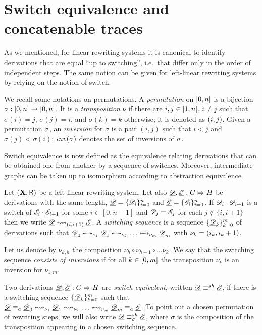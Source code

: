 \section{Switch equivalence and concatenable traces}


As we mentioned, for linear rewriting systems
it is canonical to identify
derivations that are equal ``up to switching'', i.e.~that differ
only in the order of independent steps. The same notion can be given
for left-linear rewriting systems by relying on the notion of switch.

We  recall some notations on permutations.  A \emph{permutation} on
$\interval[0]{n}$ is a bijection
$\sigma : \interval[0]{n} \to \interval[0]{n}$. It is a
\emph{transposition} $\nu$ if there are $i, j \in \interval{n}$,
$i \neq j$ such that $\sigma(i)=j$, $\sigma(j) = i$, and
$\sigma(k) = k$ otherwise; it is denoted as $\transp{i}[j]$. Given a permutation $\perm$, 
an \emph{inversion} for $\sigma$ is a pair $(i,j)$ such that $i<j$ and
$\sigma(j)< \sigma(i)$; $\inv{\sigma}$ denotes the set of
inversions of $\perm$.

Switch equivalence is now defined as the equivalence relating derivations that 
can be obtained one from another by a sequence of switches. Moreover, intermediate graphs can be taken up to isomorphism according to abstraction equivalence.

\begin{definition}
	\label{de:switch-equivalence}
	Let $(\X, \R)$ be a left-linear rewriting system.  Let also
	$\der{D}, \der{E} : G \Mapsto H$ be derivations with the same
	length, $\der{D}=\{\dder{D}_{i}\}_{i=0}^n$ and
	$\der{E}=\{\dder{E}_{i}\}_{i=0}^n$. If
	$\dder{D}_i \cdot \dder{D}_{i+1}$ is a switch of
	$\dder{E}_i \cdot \dder{E}_{i+1}$ for some $i \in [0,n-1]$ and  $\dder{D}_j = \dder{E}_j$ for each $j \not \in \{i,i+1\}$ then we write
	$\der{D} \shift{\transp{i}} \der{E}$. 
	A \emph{switching sequence} is a sequence $\{\der{D}_{k}\}_{k=0}^m$
	of derivations such that
	$\der{D}_0 \shift{\nu_1} \der{D}_1 \shift{\nu_2} \ldots
	\shift{\nu_m} \der{D}_m$  with $\nu_{k} = \transp{i_k}$.
	
	Let us denote by $\nu_{k,h}$ the composition
	$\nu_h \circ \nu_{h-1} \circ \ldots \nu_k$. We say that the
	switching sequence \emph{consists of inversions} if for all
	$k \in \interval[0]{m}$ the transposition $\nu_k$ is an inversion
	for $\nu_{1,m}$.
	
	Two derivations $\der{D}, \der{E}:G\Mapsto H$ are \emph{switch
		equivalent}, written $\der{D}\equiv^{sh} \der{E}$, if there is a
	switching sequence $\{\der{D}_{k}\}_{k=0}^m$ such that
	$\der{D}\equiv_a \der{D}_0 \shift{\nu_1} \der{D}_1 \shift{\nu_2}
	\ldots \shift{\nu_m} \der{D}_m \equiv _a \der{E}$.   
	To point out a chosen permutation of rewriting steps, we will also write $\der{D}\equiv^{sh}_{\sigma} \der{E}$, 
	where $\sigma$ is the composition of the transposition appearing in a chosen switching sequence. 
\end{definition}

